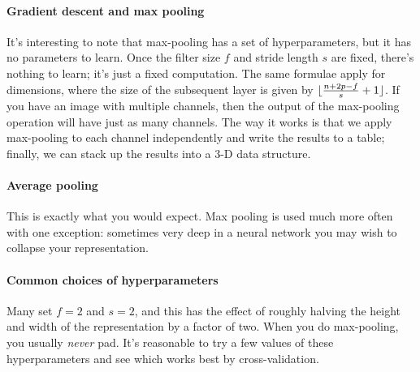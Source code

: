 \documentclass[12pt]{article}
\DeclarePairedDelimiter{\floor}{\lfloor}{\rfloor}
\begin{document}
\paragraph{Gradient descent and max pooling} It's interesting to note that max-pooling has a set of hyperparameters, but it has no
parameters to learn. Once the filter size $f$ and stride length $s$ are fixed, there's nothing to learn; it's just a fixed 
computation. The same formulae apply for dimensions, where the size of the subsequent layer is given by $\floor{\frac{n+2p - f}{s} + 1}$. If you have an image with multiple channels, then the output of the max-pooling operation will have just as many channels.
The way it works is that we apply max-pooling to each channel independently and write the results to a table; finally, we can stack up the results into a 3-D data structure.

\paragraph{Average pooling} This is exactly what you would expect. Max pooling is used much more often with one exception:
sometimes very deep in a neural network you may wish to collapse your representation.

\paragraph{Common choices of hyperparameters} Many set $f=2$ and $s=2$, and this has the effect of roughly halving the height and width of the representation by a factor of two. When you do max-pooling, you usually \emph{never} pad. It's reasonable to try a few values of these hyperparameters and see which works best by cross-validation.
\end{document}
